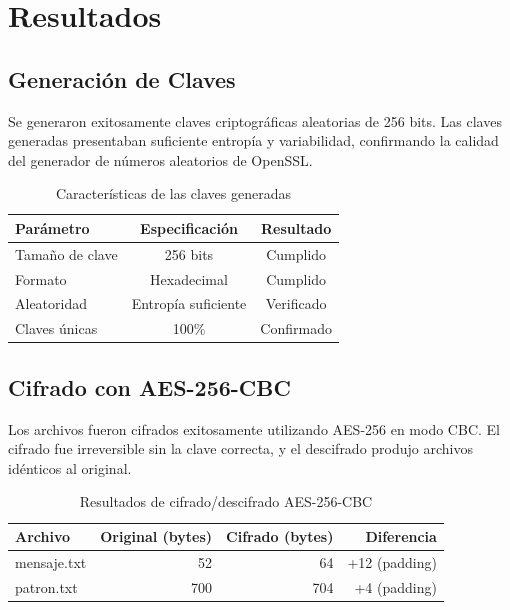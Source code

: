 \documentclass[11pt,a4paper]{article}
\begin{document}
\section{Resultados}

\subsection{Generación de Claves}

Se generaron exitosamente claves criptográficas aleatorias de 256 bits. Las claves generadas presentaban suficiente entropía y variabilidad, confirmando la calidad del generador de números aleatorios de OpenSSL.

\begin{table}[H]
\centering
\caption{Características de las claves generadas}
\begin{tabular}{|l|c|c|}
\hline
\textbf{Parámetro} & \textbf{Especificación} & \textbf{Resultado} \\ \hline
Tamaño de clave & 256 bits & Cumplido \\ \hline
Formato & Hexadecimal & Cumplido \\ \hline
Aleatoridad & Entropía suficiente & Verificado \\ \hline
Claves únicas & 100\% & Confirmado \\ \hline
\end{tabular}
\end{table}

\subsection{Cifrado con AES-256-CBC}

Los archivos fueron cifrados exitosamente utilizando AES-256 en modo CBC. El cifrado fue irreversible sin la clave correcta, y el descifrado produjo archivos idénticos al original.

\begin{table}[H]
\centering
\caption{Resultados de cifrado/descifrado AES-256-CBC}
\begin{tabular}{|l|r|r|r|}
\hline
\textbf{Archivo} & \textbf{Original (bytes)} & \textbf{Cifrado (bytes)} & \textbf{Diferencia} \\ \hline
mensaje.txt & 52 & 64 & +12 (padding) \\ \hline
patron.txt & 700 & 704 & +4 (padding) \\ \hline
\end{tabular}
\end{table}
\end{document}
